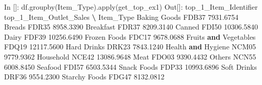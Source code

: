 \documentclass[
]{book}
\newenvironment{Shaded}{\begin{snugshade}}{\end{snugshade}}
\newcommand{\BuiltInTok}[1]{#1}
\newcommand{\FloatTok}[1]{\textcolor[rgb]{0.00,0.00,0.81}{#1}}
\newcommand{\KeywordTok}[1]{\textcolor[rgb]{0.13,0.29,0.53}{\textbf{#1}}}
\newcommand{\NormalTok}[1]{#1}
\newcommand{\OperatorTok}[1]{\textcolor[rgb]{0.81,0.36,0.00}{\textbf{#1}}}
\newcommand{\StringTok}[1]{\textcolor[rgb]{0.31,0.60,0.02}{#1}}
\begin{document}
\begin{Shaded}
\begin{Highlighting}[]
\NormalTok{In []: df.groupby(}\StringTok{\textquotesingle{}Item\_Type\textquotesingle{}}\NormalTok{).}\BuiltInTok{apply}\NormalTok{(get\_top\_ex1)}
\NormalTok{Out[]:}
\NormalTok{                      top\_1\_Item\_Identifier  top\_1\_Item\_Outlet\_Sales  }\OperatorTok{\textbackslash{}}
\NormalTok{Item\_Type                                                              }
\NormalTok{Baking Goods                          FDB37                }\FloatTok{7931.6754}   
\NormalTok{Breads                                FDR35                }\FloatTok{8958.3390}   
\NormalTok{Breakfast                             FDR37                }\FloatTok{8209.3140}   
\NormalTok{Canned                                FDI50               }\FloatTok{10306.5840}   
\NormalTok{Dairy                                 FDF39               }\FloatTok{10256.6490}   
\NormalTok{Frozen Foods                          FDC17                }\FloatTok{9678.0688}   
\NormalTok{Fruits }\KeywordTok{and}\NormalTok{ Vegetables                 FDQ19               }\FloatTok{12117.5600}   
\NormalTok{Hard Drinks                           DRK23                }\FloatTok{7843.1240}   
\NormalTok{Health }\KeywordTok{and}\NormalTok{ Hygiene                    NCM05                }\FloatTok{9779.9362}   
\NormalTok{Household                             NCE42               }\FloatTok{13086.9648}   
\NormalTok{Meat                                  FDO03                }\FloatTok{9390.4432}   
\NormalTok{Others                                NCN55                }\FloatTok{6008.8450}   
\NormalTok{Seafood                               FDI57                }\FloatTok{6503.5344}   
\NormalTok{Snack Foods                           FDP33               }\FloatTok{10993.6896}   
\NormalTok{Soft Drinks                           DRF36                }\FloatTok{9554.2300}   
\NormalTok{Starchy Foods                         FDG47                }\FloatTok{8132.0812}   


\end{Highlighting}
\end{Shaded}
\end{document}
